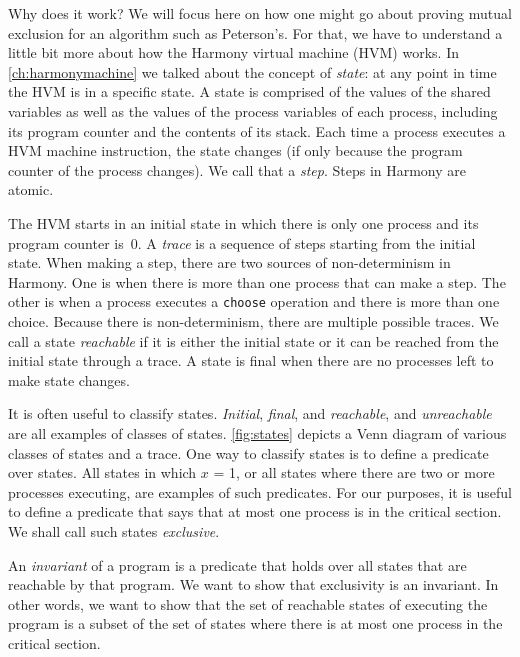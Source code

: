 \documentclass{report}
\begin{document}
%
%

Why does it work?  We will focus here on how one might go about proving
mutual exclusion for an algorithm such as Peterson's.
For that, we have to understand a little bit more about how the Harmony
virtual machine (HVM) works.
In \autoref{ch:harmonymachine} we talked about the concept of \emph{state}:
%
at any point in time the HVM is in a specific state.
A state is comprised of the values of the shared variables as well as
the values of the process variables
%
of each process, including its
program counter and the contents of its stack.
Each time a process executes a HVM machine instruction, the
state changes (if only because the program counter of the process
changes).  We call that a \emph{step}.
%
Steps in Harmony are atomic.

%
%

The HVM starts in an initial state in which there is only
one process and its program counter is~0.  A \emph{trace}
%
is a sequence of steps starting from the initial state.
When making a step, there are two sources of non-determinism
%
in Harmony.
One is when
there is more than one process that can make a step.  The other is
when a process executes a \texttt{choose} operation and there is
more than one choice.
Because there is non-determinism, there are multiple possible traces.
We call a state \emph{reachable}
%
if it is either the initial state
or it can be reached from the initial state through a trace.
A state is final
when there are no processes left to make state changes.

It is often useful to classify states.
\emph{Initial}, \emph{final}, and \emph{reachable}, and \emph{unreachable}
are all examples of classes of states.
\autoref{fig:states} depicts a Venn diagram of various classes of states
and a trace.
One way to classify states is to define a predicate over states.
All states in which $x$ = 1, or all states where
there are two or more processes executing, are examples of such predicates.
For our purposes, it is useful to define a predicate that says that at
most one process is in the critical section.  We shall call such states
\emph{exclusive}.

An \emph{invariant} of a program
%
is a predicate that holds over all states that are reachable by that program.
We want to show that exclusivity is an invariant.
In other words, we want to show that the set of reachable states of executing
the program
is a subset of the set of states where there is at most one process in the critical
section.
\end{document}
